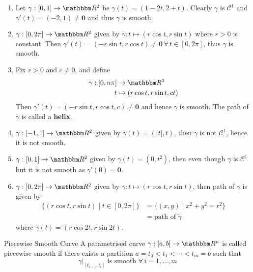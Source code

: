 \documentclass[Analysis-3]{subfiles}
\begin{document}
\begin{Eg}{}{}
    \begin{enumerate}
        \item Let $\gamma : [0,1] \to \R^2$ be $\gamma(t) = (1-2t,2+t)$. Clearly $\gamma$ is $\mathscr{C}^1$ and $\gamma'(t) = (-2,1) \neq \mathbf{0}$ and thus $\gamma$ is smooth.
    
        \item $\gamma : [0,2\pi] \to \R^2$ given by $\gamma : t \mapsto (r \cos t , r \sin t)$ where $r > 0$ is constant. Then $\gamma'(t) = (-r\sin t , r \cos t) \neq \mathbf{0} \, \forall \, t \in [0,2\pi]$, thus $\gamma$ is smooth. 
        
        \item Fix $r > 0$ and $c \neq 0$, and define 
        \begin{align*}
            \gamma : [0, n\pi] &\to \R^3 \\
            t &\mapsto (r\cos t, r\sin t , ct) 
        \end{align*}
        Then $\gamma'(t) = ( -r\sin t, r \cos t, c ) \neq \mathbf{0}$ and hence $\gamma$ is smooth. The path of $\gamma$ is called a \textbf{helix}. 

        \item $\gamma : [-1,1] \to \R^2$ given by $\gamma(t) = (|t|, t)$, then $\gamma$ is not $\mathscr{C}^1$, hence it is not smooth. 
        \item $\gamma : [0,1] \to \R^2$ given by $\gamma(t) = (0,t^2)$, then even though $\gamma$ is $\mathscr{C}^1$ but it is not smooth as $\gamma'(0) = \mathbf{0}$.
        \item $\gamma : [0,2\pi] \to \R^2$ given by $\gamma : t \mapsto (r\cos t, r\sin t)$, then path of $\gamma$ is given by 
        \begin{align*}
            \{ (r\cos t, r\sin t) \mid t \in [0,2\pi] \} &= \{ (x,y) \mid x^2 + y^2 = r^2\}    \\ 
            &= \mbox{path of } \tilde{\gamma}
        \end{align*}
        where $\tilde{\gamma}(t) = (r \cos 2t , r \sin 2t)$.
    \end{enumerate}
\end{Eg}

\begin{Def}{Piecewise Smooth Curve}{}
    A parametrised curve $\gamma : [a,b] \to \R^n$ is called piecewise smooth if there exists a partition $a = t_0 < t_1 < \cdots < t_m = b $ such that 
    \[
        \gamma\vert_{[t_{i-1}, t_i]} \mbox{ is smooth } \forall \, i = 1, \dots, m    
    \]
\end{Def}
\end{document}
